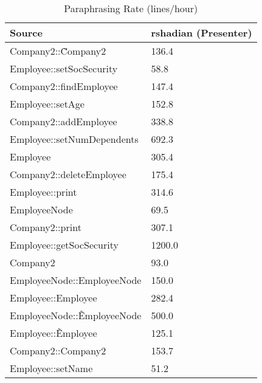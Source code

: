 \begin{table}[hb]
\begin{center}
\begin{tabular}{|l|l|}
\hline
Source & rshadian (Presenter)\\
\hline
Company2::\~Company2 & 136.4\\
Employee::setSocSecurity & 58.8\\
Company2::findEmployee & 147.4\\
Employee::setAge & 152.8\\
Company2::addEmployee & 338.8\\
Employee::setNumDependents & 692.3\\
Employee & 305.4\\
Company2::deleteEmployee & 175.4\\
Employee::print & 314.6\\
EmployeeNode & 69.5\\
Company2::print & 307.1\\
Employee::getSocSecurity & 1200.0\\
Company2 & 93.0\\
EmployeeNode::EmployeeNode & 150.0\\
Employee::Employee & 282.4\\
EmployeeNode::\~EmployeeNode & 500.0\\
Employee::\~Employee & 125.1\\
Company2::Company2 & 153.7\\
Employee::setName & 51.2\\
\hline
\end{tabular}
\end{center}
\caption{Paraphrasing Rate (lines/hour)}
\end{table}

